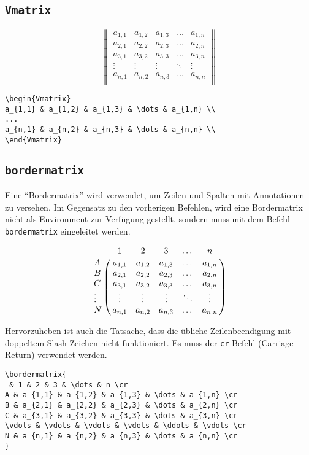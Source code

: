 \subsection{\texttt{Vmatrix}}

\begin{equation*}
\begin{Vmatrix}
a_{1,1} & a_{1,2} & a_{1,3} & \dots & a_{1,n} \\
a_{2,1} & a_{2,2} & a_{2,3} & \dots & a_{2,n} \\
a_{3,1} & a_{3,2} & a_{3,3} & \dots & a_{3,n} \\
\vdots & \vdots & \vdots & \ddots & \vdots \\
a_{n,1} & a_{n,2} & a_{n,3} & \dots & a_{n,n} \\
\end{Vmatrix}
\end{equation*}
\begin{verbatim}
\begin{Vmatrix}
a_{1,1} & a_{1,2} & a_{1,3} & \dots & a_{1,n} \\
...
a_{n,1} & a_{n,2} & a_{n,3} & \dots & a_{n,n} \\
\end{Vmatrix}
\end{verbatim}

\subsection{\texttt{bordermatrix}}

Eine "`Bordermatrix"' wird verwendet, um Zeilen und Spalten mit Annotationen zu versehen. Im Gegensatz zu den vorherigen Befehlen, wird eine Bordermatrix nicht als Environment zur Verfügung gestellt, sondern muss mit dem Befehl \texttt{bordermatrix} eingeleitet werden.

\begin{equation*}
\bordermatrix{
 & 1 & 2 & 3 & \dots & n \cr
A & a_{1,1} & a_{1,2} & a_{1,3} & \dots & a_{1,n} \cr
B & a_{2,1} & a_{2,2} & a_{2,3} & \dots & a_{2,n} \cr
C & a_{3,1} & a_{3,2} & a_{3,3} & \dots & a_{3,n} \cr
\vdots & \vdots & \vdots & \vdots & \ddots & \vdots \cr
N & a_{n,1} & a_{n,2} & a_{n,3} & \dots & a_{n,n} \cr
}
\end{equation*}

Hervorzuheben ist auch die Tatsache, dass die übliche Zeilenbeendigung mit doppeltem Slash Zeichen nicht funktioniert. Es muss der \texttt{cr}-Befehl (Carriage Return) verwendet werden.

\begin{verbatim}
\bordermatrix{
 & 1 & 2 & 3 & \dots & n \cr
A & a_{1,1} & a_{1,2} & a_{1,3} & \dots & a_{1,n} \cr
B & a_{2,1} & a_{2,2} & a_{2,3} & \dots & a_{2,n} \cr
C & a_{3,1} & a_{3,2} & a_{3,3} & \dots & a_{3,n} \cr
\vdots & \vdots & \vdots & \vdots & \ddots & \vdots \cr
N & a_{n,1} & a_{n,2} & a_{n,3} & \dots & a_{n,n} \cr
}
\end{verbatim}



